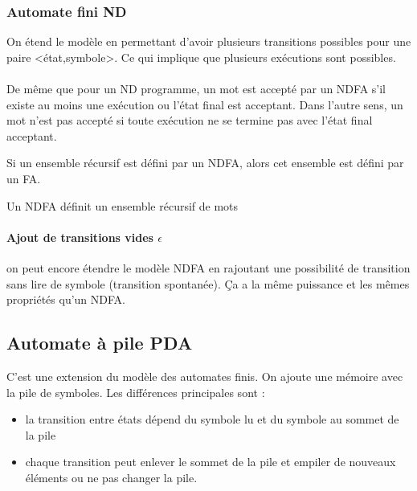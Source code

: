 \subsubsection{Automate fini ND}
\label{ssub:automate_fini_nd}
On étend le modèle en permettant d'avoir plusieurs transitions possibles pour 
une paire <état,symbole>. Ce qui implique que plusieurs exécutions sont 
possibles.

\paragraph{} De même que pour un ND programme, un mot est accepté par un NDFA 
s’il existe au moins une exécution ou l'état final est acceptant. Dans l'autre 
sens, un 
mot n'est pas accepté si toute exécution ne se termine pas avec l'état final 
acceptant.

\begin{myprop}
	Si un ensemble récursif est défini par un NDFA, alors cet ensemble est 
	défini par un FA.
\end{myprop}

\begin{myprop}
	Un NDFA définit un ensemble récursif de mots
\end{myprop}

\paragraph{Ajout de transitions vides $\epsilon$} on peut encore étendre le modèle NDFA en 
rajoutant une possibilité de transition sans lire de symbole (transition 
spontanée). Ça a la même puissance et les mêmes propriétés qu'un NDFA.


\subsection{Automate à pile PDA}
\label{sub:automate_pile}
C'est une extension du modèle des automates finis. On ajoute une mémoire avec 
la pile de symboles.
Les différences principales sont :
\begin{itemize}
	\item la transition entre états dépend du symbole lu et du symbole au 
		sommet de la pile
	\item	chaque transition peut enlever le sommet de la pile et empiler 
		de nouveaux éléments ou ne pas changer la pile.
\end{itemize}

